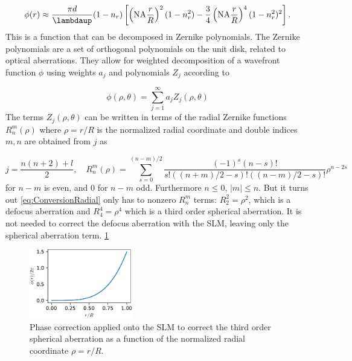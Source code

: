\begin{equation}\label{eq:ConversionRadial}
    \phi(r) \approx \frac{\pi d}{\lambdaup}(1-n_r)\left[
    \left(\text{NA}\frac{r}{R}\right)^2(1-n_r^2)-\frac{3}{4}\left(\text{NA}\frac{r}{ R}\right)^4(1-n_r^2)^2
    \right].
\end{equation}
This is a function that can be decomposed in Zernike polynomials.
The Zernike polynomials are a set of orthogonal polynomials on the unit disk, related to optical aberrations. 
They allow for weighted decomposition of a wavefront function $\phi$ using weights $a_j$ and polynomials $Z_j$ according to

\begin{equation}\label{eq:Zernike}
    \phi(\rho,\theta) = \sum_{j=1}^\infty a_j Z_j(\rho,\theta)
\end{equation}
The terms $Z_j(\rho,\theta)$ can be written in terms of the radial Zernike functions $R_n^m(\rho)$ where $\rho=r/R$ is the normalized radial coordinate and double indices $m,n$ are obtained from $j$ as 

\begin{equation}\label{eq:ZernikeRadial}
    j = \frac{n(n+2)+l}{2}, \quad
    R_{n}^{m}(\rho)=
    \sum_{s=0}^{(n-m) / 2}
    \frac{(-1)^{s}(n-s) !}{s !\left((n+m)/2-s\right) !\left((n-m)/2-s\right) !} \rho^{n-2 s}
\end{equation}
for $n-m$ is even, and 0 for $n-m$ odd. Furthermore $n \leq 0$, $|m| \leq n$. But it turns out \cref{eq:ConversionRadial} only has to nonzero $R_n^m$ terms: $R_2^2 = \rho^2$, which is a defocus aberration and $R_4^4 =\rho^4$ which is a third order spherical aberration. It is not needed to correct the defocus aberration with the SLM, leaving only the spherical aberration term. \cref{fig:AberrationTerm}

\begin{figure}
    \centering
    \includegraphics[width=0.4\textwidth]{figures/SphericalAberrationTerm.pdf}
    \caption{Phase correction applied onto the SLM to correct the third order spherical aberration as a function of the normalized radial coordinate $\rho=r/R$.}
    \label{fig:AberrationTerm}
\end{figure}


















